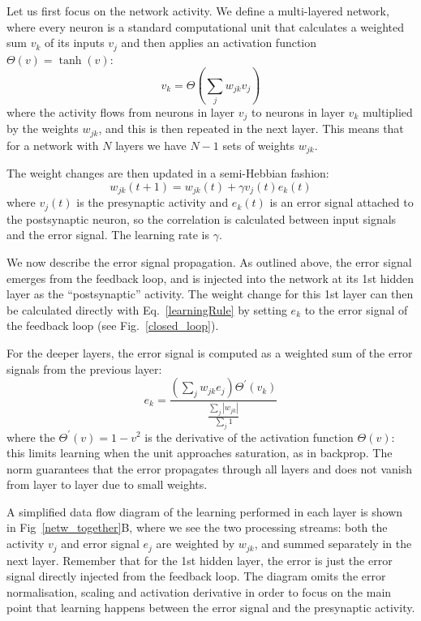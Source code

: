 \documentclass{aamas2018}
\begin{document}
Let us first focus on the network activity. We define a multi-layered
network, where every neuron is a standard computational unit that
calculates a weighted sum $v_k$ of its inputs $v_j$ and then applies
an activation function $\Theta(v) = \tanh(v)$:
\begin{equation}
  v_k = \Theta\left( \sum_j w_{jk} v_{j} \right) \label{act_sum}
\end{equation}
where the activity flows from neurons in layer $v_j$ to neurons in
layer $v_k$ multiplied by the weights $w_{jk}$, and this
is then repeated in the next layer. This means that for a network with
$N$ layers we have $N-1$ sets of weights $w_{jk}$.

The weight changes are then updated in a semi-Hebbian fashion:
\begin{equation}
  w_{jk}(t+1) = w_{jk}(t) + \gamma v_j(t)  e_k(t) \label{learningRule}
\end{equation}
where $v_j(t)$ is the presynaptic activity and $e_k(t)$ is an error
signal attached to the postsynaptic neuron, so the correlation is
calculated between input signals and the error signal. The learning
rate is $\gamma$.

We now describe the error signal propagation. As outlined above, the
error signal emerges from the feedback loop, and is injected into the
network at its 1st hidden layer as the ``postsynaptic'' activity. The
weight change for this 1st layer can then be calculated directly with
Eq.~\ref{learningRule} by setting $e_k$ to the error signal of the
feedback loop (see Fig.~\ref{closed_loop}).

For the deeper layers, the error signal is computed as a weighted
sum of the error signals from the previous layer:
\begin{equation}
e_k = \frac{\left( \sum_j w_{jk} e_{j} \right) \Theta^\prime (v_k) }{\frac{\sum_j {|w_{jk}|}}{\sum_j 1}}
\end{equation}
where the $\Theta^\prime (v) = 1 - v^2$ is the derivative of the
activation function $\Theta(v)$: this limits learning when the unit
approaches saturation, as in backprop. The norm guarantees that
the error propagates through all layers and does not vanish from
layer to layer due to small weights.


A simplified data flow diagram of the learning performed in each layer
is shown in Fig~\ref{netw_together}B, where we see the two processing
streams: both the activity $v_j$ and error signal $e_j$ are weighted
by $w_{jk}$, and summed separately in the next layer. Remember that
for the 1st hidden layer, the error is just the error signal
directly injected from the feedback loop. The diagram omits the error
normalisation, scaling and activation derivative in order to focus on
the main point that learning happens between the error signal and the
presynaptic activity.
\end{document}
